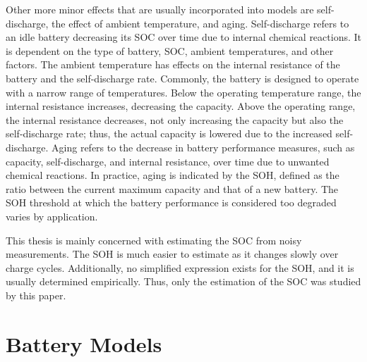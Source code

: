 \documentclass[../zhang_thesis.tex]{subfiles}
\begin{document}
Other more minor effects that are usually incorporated into models are self-discharge, the effect of ambient temperature, and aging. Self-discharge refers to an idle battery decreasing its SOC over time due to internal chemical reactions. It is dependent on the type of battery, SOC, ambient temperatures, and other factors. The ambient temperature has effects on the internal resistance of the battery and the self-discharge rate. Commonly, the battery is designed to operate with a narrow range of temperatures. Below the operating temperature range, the internal resistance increases, decreasing the capacity. Above the operating range, the internal resistance decreases, not only increasing the capacity but also the self-discharge rate; thus, the actual capacity is lowered due to the increased self-discharge. Aging refers to the decrease in battery performance measures, such as capacity, self-discharge, and internal resistance, over time due to unwanted chemical reactions. In practice, aging is indicated by the SOH, defined as the ratio between the current maximum capacity and that of a new battery. The SOH threshold at which the battery performance is considered too degraded varies by application.

This thesis is mainly concerned with estimating the SOC from noisy measurements. The SOH is much easier to estimate as it changes slowly over charge cycles. Additionally, no simplified expression exists for the SOH, and it is usually determined empirically. Thus, only the estimation of the SOC was studied by this paper.



\section{Battery Models}
\end{document}
